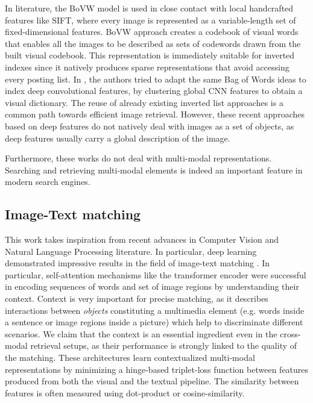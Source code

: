 \documentclass[conference]{IEEEtran}
\begin{document}
In literature, the BoVW model is used in close contact with local handcrafted features like SIFT, where every image is represented as a variable-length set of fixed-dimensional features. BoVW approach creates a codebook of visual words that enables all the images to be described as sets of codewords drawn from the built visual codebook.
This representation is immediately suitable for inverted indexes since it natively produces sparse representations that avoid accessing every posting list. In \cite{liu2018cnnindexing}, the authors tried to adapt the same Bag of Words ideas to index deep convolutional features, by clustering global CNN features to obtain a visual dictionary. The reuse of already existing inverted list approaches is a common path towards efficient image retrieval.
However, these recent approaches based on deep features do not natively deal with images as a set of objects, as deep features usually carry a global description of the image.

Furthermore, these works do not deal with multi-modal representations. Searching and retrieving multi-modal elements is indeed an important feature in modern search engines.

\subsection*{Image-Text matching}
This work takes inspiration from recent advances in Computer Vision and Natural Language Processing literature. In particular, deep learning demonstrated impressive results in the field of image-text matching \cite{vsepp2018faghri,li2019,lu2019vilbert,lee2019}. In particular, self-attention mechanisms like the transformer encoder \cite{devlin2019bert,vaswani2017transformer} were successful in encoding sequences of words and set of image regions by understanding their context. Context is very important for precise matching, as it describes interactions between \textit{objects} constituting a multimedia element (e.g. words inside a sentence or image regions inside a picture) which help to discriminate different scenarios. We claim that the context is an essential ingredient even in the cross-modal retrieval setups, as their performance is strongly linked to the quality of the matching.
These architectures learn contextualized multi-modal representations by minimizing a hinge-based triplet-loss function between features produced from both the visual and the textual pipeline. The similarity between features is often measured using dot-product or cosine-similarity.
\end{document}
